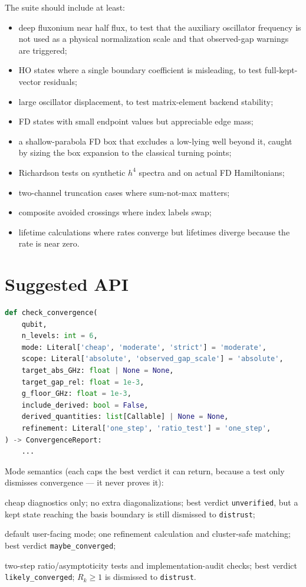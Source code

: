 \documentclass[11pt,a4paper]{article}
\begin{document}
The suite should include at least:
\begin{itemize}
\item deep fluxonium near half flux, to test that the auxiliary oscillator frequency is not used as a physical normalization scale and that observed-gap warnings are triggered;
\item HO states where a single boundary coefficient is misleading, to test full-kept-vector residuals;
\item large oscillator displacement, to test matrix-element backend stability;
\item FD states with small endpoint values but appreciable edge mass;
\item a shallow-parabola FD box that excludes a low-lying well beyond it, caught by sizing the box expansion to the classical turning points;
\item Richardson tests on synthetic $h^4$ spectra and on actual FD Hamiltonians;
\item two-channel truncation cases where sum-not-max matters;
\item composite avoided crossings where index labels swap;
\item lifetime calculations where rates converge but lifetimes diverge because the rate is near zero.
\end{itemize}

\section{Suggested API}

\begin{lstlisting}[language=Python]
def check_convergence(
    qubit,
    n_levels: int = 6,
    mode: Literal['cheap', 'moderate', 'strict'] = 'moderate',
    scope: Literal['absolute', 'observed_gap_scale'] = 'absolute',
    target_abs_GHz: float | None = None,
    target_gap_rel: float = 1e-3,
    g_floor_GHz: float = 1e-3,
    include_derived: bool = False,
    derived_quantities: list[Callable] | None = None,
    refinement: Literal['one_step', 'ratio_test'] = 'one_step',
) -> ConvergenceReport:
    ...
\end{lstlisting}

Mode semantics (each caps the best verdict it can return, because a test only
dismisses convergence --- it never proves it):
\begin{description}[leftmargin=2.6cm,style=nextline]
\item[cheap] cheap diagnostics only; no extra diagonalizations; best verdict \texttt{unverified}, but a kept state reaching the basis boundary is still dismissed to \texttt{distrust};
\item[moderate] default user-facing mode; one refinement calculation and cluster-safe matching; best verdict \texttt{maybe\_converged};
\item[strict] two-step ratio/asymptoticity tests and implementation-audit checks; best verdict \texttt{likely\_converged}; \(R_k\ge 1\) is dismissed to \texttt{distrust}.
\end{description}
\end{document}
